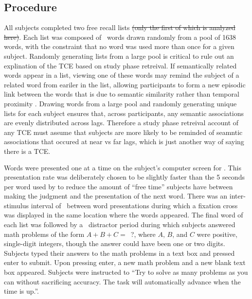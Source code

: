 \documentclass[man,natbib,floatsintext]{apa6} %
\begin{document}
\subsection{Procedure}
All subjects completed two free recall lists \st{(only the first of which is analyzed here)}. Each list was composed of \listlength~words drawn randomly from a pool of 1638 words, with the constraint that no word was used more than once for a given subject. \color{red} Randomly generating lists from a large pool is critical to rule out an explination of the TCE based on study phase retreival. If semantically related words appear in a list, viewing one of these words may remind the subject of a related word from eariler in the list, allowing participants to form a new episodic link between the words that is due to semantic similarity rather than temporal proximity \citep{HintEtal75,HintBloc73,Hint16}. Drawing words from a large pool and randomly generating unique lists for each subject ensures that, across participants, any semantic associations are evenly distributed across lags. Therefore a study phase retreival account of any TCE must assume that subjects are more likely to be reminded of seamntic associations that occured at near vs far lags, which is just another way of saying there is a TCE. \color{black}

Words were presented one at a time on the subject's computer screen for \presrate. This presentation rate was deliberately chosen to be slightly faster than the 5 seconds per word used by \citet{NairEtal17} to reduce the amount of ``free time'' subjects have between making the judgment and the presentation of the next word.
There was an inter-stimulus interval of \isi~between word presentations during which a fixation cross was displayed in the same location where the words appeared. The final word of each list was followed by a \DFRDelay~distractor period during which subjects answered math problems of the form $A+B+C=$~?, where $A$, $B$, and $C$ were positive, single-digit integers, though the answer could have been one or two digits. Subjects typed their answers to the math problems in a text box and pressed enter to submit. Upon pressing enter, a new math problem and a new blank text box appeared. Subjects were instructed to ``Try to solve as many problems as you can without sacrificing accuracy. The task will automatically advance when the time is up.''.
\end{document}
